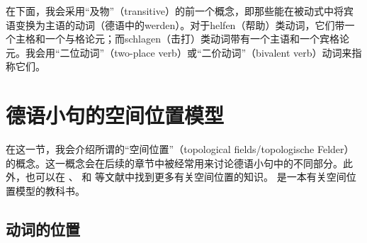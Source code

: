 在下面，我会采用“及物”（transitive）的前一个概念，即那些能在被动式中将宾语变换为主语的动词（\egc 德语中的werden）。对于helfen（帮助）类动词，它们带一个主格和一个与格论元；而schlagen（击打）类动词带有一个主语和一个宾格论元。我会用“二位动词”（two-place verb）或“二价动词”（bivalent verb）动词来指称它们。

\section{德语小句的空间位置模型}
\label{sec-topo}
\label{Abschnitt-Toplogie}

%
在这一节，我会介绍所谓的“空间位置”（topological fields/topologische Felder）的概念。这一概念会在后续的章节中被经常用来讨论德语小句中的不同部分。此外，也可以在  、 和 等文献中找到更多有关空间位置的知识。 是一本有关空间位置模型的教科书。

\subsection{动词的位置}

